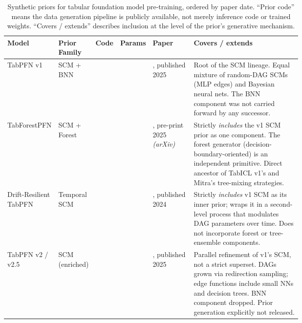 \documentclass{article}
\newcommand{\cmark}{\ding{51}}
\newcommand{\xmark}{\ding{55}}
\begin{document}
\begin{table}[ht]
\centering
\small
\caption{Synthetic priors for tabular foundation model pre-training, ordered by paper date.
``Prior code'' means the data generation pipeline is publicly available, not merely inference code or trained weights.
``Covers / extends'' describes inclusion at the level of the prior's generative mechanism.}
\label{tab:synthetic-priors}
\setlength{\tabcolsep}{5pt}
\begin{tabular}{p{0.12\linewidth}  p{0.07\linewidth} c c p{0.14\linewidth} p{0.375\linewidth}}
\toprule
\textbf{Model}  & \textbf{Prior Family} & \textbf{Code} & \textbf{Params} & \textbf{Paper} & \textbf{Covers / extends} \\
\midrule

TabPFN v1
& SCM + BNN
& \xmark
& \xmark
& \citet{hollmannAccuratePredictionsSmall2025}, published 2025
& Root of the SCM lineage. Equal mixture of random-DAG SCMs (MLP edges) and Bayesian neural nets. The BNN component was not carried forward by any successor. \\\midrule


TabForestPFN
& SCM + Forest
& \cmark
& \cmark
& \citet{breejenFinetunedInContextLearning2025}, pre-print 2025 \textit{(arXiv)}
& Strictly \emph{includes} the v1 SCM prior as one component. The forest generator (decision-boundary-oriented) is an independent primitive. Direct ancestor of TabICL v1's and Mitra's tree-mixing strategies. \\\midrule


Drift-Resilient TabPFN
& Temporal SCM
& \cmark
& \xmark
& \citet{helliDriftresilientTabPFNIncontext2024}, published 2024
& Strictly \emph{includes} v1 SCM as its inner prior; wraps it in a second-level process that modulates DAG parameters over time. Does not incorporate forest or tree-ensemble components. \\\midrule


TabPFN v2 / v2.5
& SCM (enriched)
& \xmark
& \xmark
& \citet{hollmannAccuratePredictionsSmall2025}, published 2025
& Parallel refinement of v1's SCM, not a strict superset. DAGs grown via redirection sampling; edge functions include small NNs and decision trees. BNN component dropped. Prior generation explicitly not released. \\\midrule


\end{tabular}
\end{table}
\end{document}
